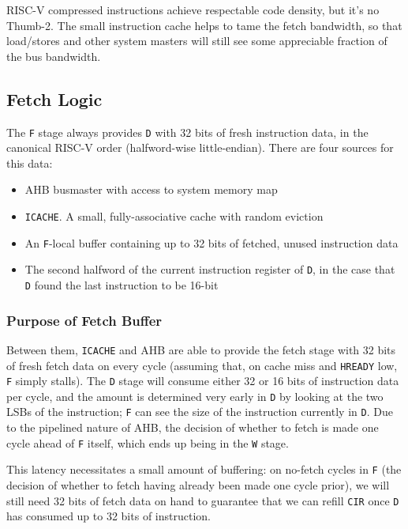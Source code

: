 \documentclass{article}
\begin{document}
RISC-V compressed instructions achieve respectable code density, but it's no Thumb-2. The small instruction cache helps to tame the fetch bandwidth, so that load/stores and other system masters will still see some appreciable fraction of the bus bandwidth.

\subsection{Fetch Logic}

The \texttt{F} stage always provides \texttt{D} with 32 bits of fresh instruction data, in the canonical RISC-V order (halfword-wise little-endian). There are four sources for this data:

\begin{itemize}
\item AHB busmaster with access to system memory map
\item \texttt{ICACHE}. A small, fully-associative cache with random eviction
\item An \texttt{F}-local buffer containing up to 32 bits of fetched, unused instruction data
\item The second halfword of the current instruction register of \texttt{D}, in the case that \texttt{D} found the last instruction to be 16-bit
\end{itemize}

\subsubsection{Purpose of Fetch Buffer}

Between them, \texttt{ICACHE} and AHB are able to provide the fetch stage with 32 bits of fresh fetch data on every cycle (assuming that, on cache miss and \texttt{HREADY} low, \texttt{F} simply stalls). The \texttt{D} stage will consume either 32 or 16 bits of instruction data per cycle, and the amount is determined very early in \texttt{D} by looking at the two LSBs of the instruction; \texttt{F} can see the size of the instruction currently in \texttt{D}. Due to the pipelined nature of AHB, the decision of whether to fetch is made one cycle ahead of \texttt{F} itself, which ends up being in the \texttt{W} stage.

This latency necessitates a small amount of buffering: on no-fetch cycles in \texttt{F} (the decision of whether to fetch having already been made one cycle prior), we will still need 32 bits of fetch data on hand to guarantee that we can refill \texttt{CIR} once \texttt{D} has consumed up to 32 bits of instruction.
\end{document}
